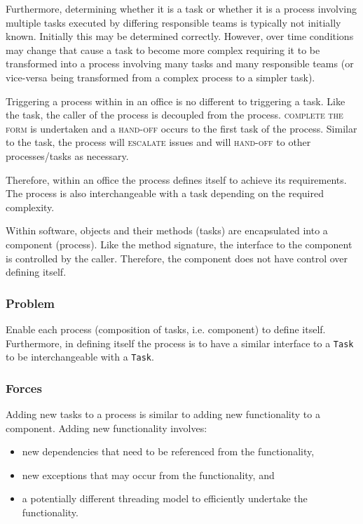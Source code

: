 \documentclass[prodmode]{style/acmlarge}
\begin{document}
Furthermore, determining whether it is a task or whether it is a process involving
multiple tasks executed by differing responsible teams is typically not
initially known.  Initially this may be determined correctly.  However, over
time conditions may change that cause a task to become more complex requiring
it to be transformed into a process involving many tasks and many responsible
teams (or vice-versa being transformed from a complex process to a simpler task).

Triggering a process within in an office is no different to triggering a task.
Like the task, the caller of the process is decoupled from the process.
\textsc{complete the form} is undertaken and a \textsc{hand-off} occurs to the
first task of the process.  Similar to the task, the process will
\textsc{escalate} issues and will \textsc{hand-off} to other processes/tasks as
necessary.

Therefore, within an office the process defines itself to achieve its
requirements.  The process is also interchangeable with a task depending on the
required complexity.

Within software, objects and their methods (tasks) are encapsulated into a
component (process).  Like the method signature, the interface to the component
is controlled by the caller.  Therefore, the component does not have control
over defining itself.

\subsubsection*{\textbf{Problem}} Enable each process (composition of tasks, i.e.
component) to define itself.  Furthermore, in defining itself the process is to
have a similar interface to a \texttt{Task} to be interchangeable with a
\texttt{Task}.

\subsubsection*{Forces} Adding new tasks to a process is similar to adding new
functionality to a component.  Adding new functionality involves:
\begin{itemize}
  \item new dependencies that need to be referenced from the functionality,
  \item new exceptions that may occur from the functionality, and
  \item a potentially different threading model to efficiently undertake the functionality. 
\end{itemize}
\end{document}
